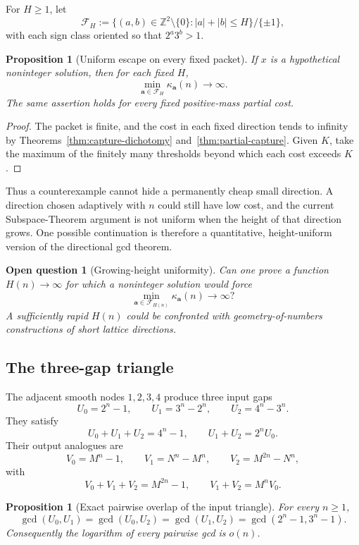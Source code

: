 \documentclass[11pt,oneside]{article}
\newtheorem{proposition}[theorem]{Proposition}
\newtheorem{question}[theorem]{Open question}
\theoremstyle{definition}
\theoremstyle{remark}
\newcommand{\Z}{\mathbb Z}
\begin{document}
For $H\ge1$, let
\[
 \mathcal F_H
 :=\{(a,b)\in\Z^2\setminus\{0\}:|a|+|b|\le H\}/\{\pm1\},
\]
with each sign class oriented so that $2^a3^b>1$.

\begin{proposition}[Uniform escape on every fixed packet]
\label{prop:finite-packet}
If $x$ is a hypothetical noninteger solution, then for each fixed $H$,
\[
 \min_{\mathbf a\in\mathcal F_H}\kappa_{\mathbf a}(n)\longrightarrow\infty.
\]
The same assertion holds for every fixed positive-mass partial cost.
\end{proposition}

\begin{proof}
The packet is finite, and the cost in each fixed direction tends to infinity by
Theorems~\ref{thm:capture-dichotomy} and~\ref{thm:partial-capture}.  Given $K$, take the
maximum of the finitely many thresholds beyond which each cost exceeds $K$.
\end{proof}

Thus a counterexample cannot hide a permanently cheap small direction.  A direction chosen
adaptively with $n$ could still have low cost, and the current Subspace-Theorem argument is
not uniform when the height of that direction grows.  One possible continuation is therefore
a quantitative, height-uniform version of the directional gcd theorem.

\begin{question}[Growing-height uniformity]
Can one prove a function $H(n)\to\infty$ for which a noninteger solution would force
\[
 \min_{\mathbf a\in\mathcal F_{H(n)}}\kappa_{\mathbf a}(n)\to\infty?
\]
A sufficiently rapid $H(n)$ could be confronted with geometry-of-numbers constructions of
short lattice directions.
\end{question}

\subsection{The three-gap triangle}

The adjacent smooth nodes $1,2,3,4$ produce three input gaps
\[
 U_0=2^n-1,
 \qquad U_1=3^n-2^n,
 \qquad U_2=4^n-3^n.
\]
They satisfy
\[
 U_0+U_1+U_2=4^n-1,
 \qquad U_1+U_2=2^nU_0.
\]
Their output analogues are
\[
 V_0=M^n-1,
 \qquad V_1=N^n-M^n,
 \qquad V_2=M^{2n}-N^n,
\]
with
\[
 V_0+V_1+V_2=M^{2n}-1,
 \qquad V_1+V_2=M^nV_0.
\]

\begin{proposition}[Exact pairwise overlap of the input triangle]
\label{prop:triangle-gcd}
For every $n\ge1$,
\[
 \gcd(U_0,U_1)=\gcd(U_0,U_2)=\gcd(U_1,U_2)
 =\gcd(2^n-1,3^n-1).
\]
Consequently the logarithm of every pairwise gcd is $o(n)$.
\end{proposition}
\end{document}

